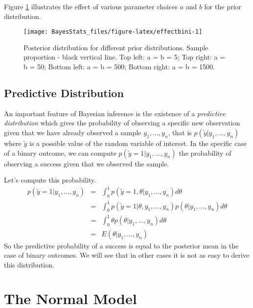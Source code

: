 \documentclass[
]{book}
\begin{document}
Figure \ref{fig:effectbini} illustrates the effect of various parameter choices \(a\) and \(b\) for the prior distribution.

\begin{figure}

{\centering \texttt{[image: BayesStats\_files/figure-latex/effectbini-1]} 

}

\caption{Posterior distribution for different prior distributions. Sample proportion - black vertical line. Top left: a = b = 5; Top right: a = b = 50; Bottom left: a = b = 500; Bottom right: a = b = 1500.}\label{fig:effectbini}
\end{figure}

\hypertarget{predictive-distribution}{%
\section{Predictive Distribution}\label{predictive-distribution}}

An important feature of Bayesian inference is the existence of a \emph{predictive distribution} which gives the probability of observing a specific new observation given that we have already observed a sample \(y_1,\dots,y_n\), that is \(p(\tilde{y}|y_1,\dots,y_n)\) where \(\tilde{y}\) is a possible value of the random variable of interest. In the specific case of a binary outcome, we can compute \(p(\tilde{y}=1|y_1,\dots,y_n)\) the probability of observing a success given that we observed the sample.

Let's compute this probability.
\begin{eqnarray*}
p(\tilde{y}=1|y_1,\dots,y_n)&=& \int_{0}^1p(\tilde{y}=1,\theta|y_1,\dots,y_n)d\theta\\
&=& \int_{0}^1p(\tilde{y}=1|\theta,y_1,\dots,y_n)p(\theta|y_1,\dots,y_n)d\theta\\
&=&\int_{0}^1\theta p(\theta|y_1,\dots,y_n)d\theta\\
&=& E(\theta|y_1,\dots,y_n)
\end{eqnarray*}
So the predictive probability of a success is equal to the posterior mean in the case of binary outcomes. We will see that in other cases it is not as easy to derive this distribution.

\hypertarget{norm}{%
\chapter{The Normal Model}\label{norm}}
\end{document}
